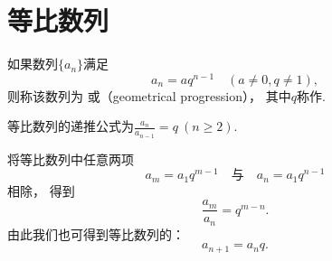 \section{等比数列}
\begin{definition}
如果数列\(\{a_n\}\)满足\begin{equation*}
	a_n = a q^{n-1} \quad(a\neq0,q\neq1),
\end{equation*}
则称该数列为
或（geometrical progression），
其中\(q\)称作.

等比数列的递推公式为\(\frac{a_n}{a_{n-1}} = q\ (n \geq 2)\).
\end{definition}

将等比数列中任意两项\begin{equation*}
    a_m = a_1 q^{m-1}
    \quad\text{与}\quad
    a_n = a_1 q^{n-1}
\end{equation*}相除，
得到\begin{equation*}
    \frac{a_m}{a_n} = q^{m-n}.
\end{equation*}
由此我们也可得到等比数列的：
\begin{equation}
	a_{n+1} = a_n q.
\end{equation}

